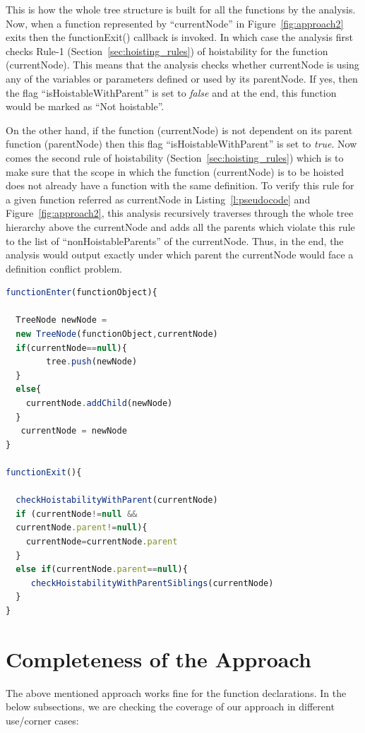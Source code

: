 \documentclass[authoryear,preprint]{sigplanconf}
\begin{document}
This is how the whole tree structure is built for all the functions by the analysis. Now, when a function represented by \enquote{currentNode} in Figure~\ref{fig:approach2} exits then the functionExit() callback is invoked. In which case the analysis first checks Rule-1 (Section~\ref{sec:hoisting_rules}) of hoistability for the function (currentNode). This means that the analysis checks whether currentNode is using any of the variables or parameters defined or used by its parentNode. If yes, then the flag \enquote{isHoistableWithParent} is set to \textit{false} and at the end, this function would be marked as \enquote{Not hoistable}.\par
On the other hand, if the function (currentNode) is not dependent on its parent function (parentNode) then this flag \enquote{isHoistableWithParent} is set to \textit{true}. Now comes the second rule of hoistability (Section~\ref{sec:hoisting_rules}) which is to make sure that the scope in which the function (currentNode) is to be hoisted does not already have a function with the same definition. To verify this rule for a given function referred as currentNode in Listing~\ref{l:pseudocode} and Figure~\ref{fig:approach2}, this analysis recursively traverses through the whole tree hierarchy above the currentNode and adds all the parents which violate this rule to the list of \enquote{nonHoistableParents} of the currentNode. Thus, in the end, the analysis would output exactly under which parent the currentNode would face a definition conflict problem.

\lstset{numbers=left, numberstyle=\tiny, stepnumber=1, numbersep=5pt}
\lstset{basicstyle=\ttfamily}
\lstset{frame=tb, frame=bottomline}

\begin{lstlisting}[float,caption= Pseudocode of the Analysis ,label=l:pseudocode,language=JavaScript]
functionEnter(functionObject){

  TreeNode newNode = 
  new TreeNode(functionObject,currentNode)
  if(currentNode==null){
		tree.push(newNode)
  }
  else{
  	currentNode.addChild(newNode)
  }
   currentNode = newNode
}

functionExit(){

  checkHoistabilityWithParent(currentNode)
  if (currentNode!=null && 
  currentNode.parent!=null){
	currentNode=currentNode.parent
  }
  else if(currentNode.parent==null){
     checkHoistabilityWithParentSiblings(currentNode)
  }
}
\end{lstlisting} 

\section{Completeness of the Approach}
\label{sec:completeness}
The above mentioned approach works fine for the function declarations. In the below subsections, we are checking the coverage of our approach in different use/corner cases:
\end{document}
